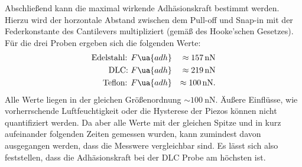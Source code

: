 Abschließend kann die maximal wirkende Adhäsionskraft bestimmt werden. Hierzu wird der horzontale
Abstand zwischen dem Pull-off und Snap-in mit der Federkonstante des Cantilevers multipliziert (gemäß des Hooke'schen Gesetzes).
Für die drei Proben ergeben sich die folgenden Werte:
\begin{align}
  \begin{aligned}
    \text{Edelstahl: } & F\ua{adh} &\approx \SI{157}{\nano\newton}\\
    \text{DLC: } & F\ua{adh}       &\approx \SI{219}{\nano\newton}\\
    \text{Teflon: } & F\ua{adh}    &\approx \SI{100}{\nano\newton}.
  \end{aligned}
\end{align}
Alle Werte liegen in der gleichen Größenordnung $\sim \SI{100}{\nano\newton}$. Äußere Einflüsse, wie vorherrschende Luftfeuchtigkeit
oder die Hysterese der Piezos können nicht quantifiziert werden. Da aber alle Werte mit der gleichen Spitze und in kurz aufeinander
folgenden Zeiten gemessen wurden, kann zumindest davon ausgegangen werden, dass die Messwere vergleichbar sind. Es lässt sich also feststellen, dass die
Adhäsionskraft bei der DLC Probe am höchsten ist.
\FloatBarrier
